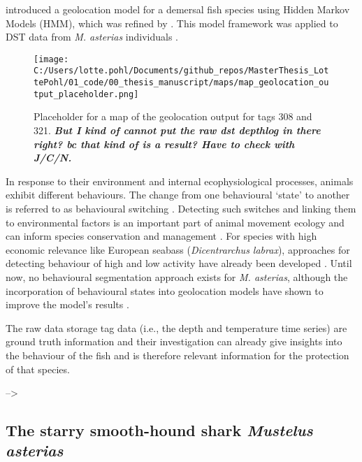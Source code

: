 \documentclass[
  authoryear,
  review,
  3p]{elsarticle}
\begin{document}
\citet{pedersen_2008} introduced a geolocation model for a demersal fish
species using Hidden Markov Models (HMM), which was refined by
\citet{woillez_2016}. This model framework was applied to DST data from
\emph{M. asterias} individuals \citep[see][the geolocation results for
one female and one male shark are shown in
Figure~\ref{fig-mapgeolocation}]{goossens_2023}.

\begin{figure}

{\centering \texttt{[image: C:/Users/lotte.pohl/Documents/github\_repos/MasterThesis\_LottePohl/01\_code/00\_thesis\_manuscript/maps/map\_geolocation\_output\_placeholder.png]}

}

\caption{\label{fig-mapgeolocation}Placeholder for a map of the
geolocation output for tags 308 and 321. \textbf{\emph{But I kind of
cannot put the raw dst depthlog in there right? bc that kind of is a
result? Have to check with J/C/N.}}}

\end{figure}

In response to their environment and internal ecophysiological
processes, animals exhibit different behaviours. The change from one
behavioural `state' to another is referred to as behavioural switching
\citep{gurarie_2016}. Detecting such switches and linking them to
environmental factors is an important part of animal movement ecology
and can inform species conservation and management \citep{hays_2016}.
For species with high economic relevance like European seabass
(\emph{Dicentrarchus labrax}), approaches for detecting behaviour of
high and low activity have already been developed \citep{heerah_2017}.
Until now, no behavioural segmentation approach exists for \emph{M.
asterias}, although the incorporation of behavioural states into
geolocation models have shown to improve the model's results
\citep{pedersen_2008}.

The raw data storage tag data (i.e., the depth and temperature time
series) are ground truth information and their investigation can already
give insights into the behaviour of the fish and is therefore relevant
information for the protection of that species.

--\textgreater{}

\hypertarget{the-starry-smooth-hound-shark-mustelus-asterias}{%
\subsection{\texorpdfstring{The starry smooth-hound shark \emph{Mustelus
asterias}}{The starry smooth-hound shark Mustelus asterias}}\label{the-starry-smooth-hound-shark-mustelus-asterias}}
\end{document}
